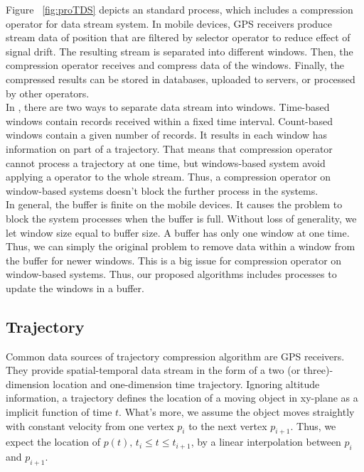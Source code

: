 \documentclass[12pt]{article}
\begin{document}
\begin{CJK}{UTF8}{bsmi}
Figure ~\ref{fig:proTDS} depicts an standard process, which includes a compression operator for data stream system. In mobile devices, GPS receivers produce stream data of position that are filtered by selector operator to reduce effect of signal drift. The resulting stream is separated into different windows. Then, the compression operator receives and compress data of the windows. Finally, the compressed results can be stored in databases, uploaded to servers, or processed by other operators. \\

In \cite{2002:VLDB_window}, there are two ways to separate data stream into windows. Time-based windows contain records received within a fixed time interval. Count-based windows contain a given number of records. It results in each window has information on part of a trajectory. That means that compression operator cannot process a trajectory at one time, but windows-based system avoid applying a operator to the whole stream. Thus, a compression operator on window-based systems doesn't block the further process in the systems.\\

In general, the buffer is finite on the mobile devices. It causes the problem to block the system processes when the buffer is full. Without loss of generality, we let window size equal to buffer size. A buffer has only one window at one time. Thus, we can simply the original problem to remove data within a window from the buffer for newer windows. This is a big issue for compression operator on window-based systems. Thus, our proposed algorithms includes processes to update the windows in a buffer.\\


\subsection{Trajectory}

Common data sources of trajectory compression algorithm are GPS receivers. They provide spatial-temporal data stream in the form of a two (or three)-dimension location and one-dimension time trajectory. Ignoring altitude information, a trajectory defines the location of a moving object in xy-plane as a implicit function of time $t$. What's more, we assume the object moves straightly with constant velocity from one vertex $p_i$ to the next vertex $p_{i+1}$. Thus, we expect the location of $p(t),\, t_{i} \leq t \leq t_{i+1}$, by a linear interpolation between $p_i$ and $p_{i+1}$.



\end{CJK}
\end{document}
